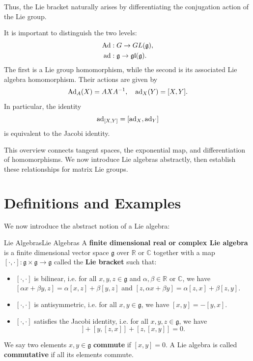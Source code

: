 \documentclass[../main.tex]{subfiles}
\begin{document}
Thus, the Lie bracket naturally arises by differentiating the conjugation action of the Lie group.

\begin{remark}
  It is important to distinguish the two levels:
  \begin{equation}
    \begin{aligned}
      \operatorname{Ad} &:G\to GL(\mathfrak{g}),\\
      \operatorname{ad} &:\mathfrak{g}\to\mathfrak{gl}(\mathfrak{g}).
    \end{aligned}
  \end{equation}
  The first is a Lie group homomorphism, while the second is its associated Lie algebra homomorphism. Their actions are given by
  \begin{equation}
    \operatorname{Ad}_A(X)=AXA^{-1},\quad
    \operatorname{ad}_X(Y)=[X,Y].
  \end{equation}
  In particular, the identity
  \begin{equation}
    \operatorname{ad}_{[X,Y]}=[\operatorname{ad}_X,\operatorname{ad}_Y]
  \end{equation}
  is equivalent to the Jacobi identity.
\end{remark}

This overview connects tangent spaces, the exponential map, and differentiation of homomorphisms. We now introduce Lie algebras abstractly, then establish these relationships for matrix Lie groups.

\section{Definitions and Examples}

We now introduce the abstract notion of a Lie algebra:

\begin{definition}{Lie Algebras}{Lie Algebras}
  A \textbf{finite dimensional real or complex Lie algebra} is a finite dimensional vector space $\mathfrak{g}$ over $\mathbb{R}$ or $\mathbb{C}$ together with a map $[\cdot,\cdot]:\mathfrak{g}\times\mathfrak{g}\to\mathfrak{g}$ called the \textbf{Lie bracket} such that:
  \begin{itemize}
    \item $[\cdot,\cdot]$ is bilinear, i.e. for all $x,y,z\in\mathfrak{g}$ and $\alpha,\beta\in\mathbb{R}$ or $\mathbb{C}$, we have $[\alpha x+\beta y,z]=\alpha[x,z]+\beta[y,z]$ and $[z,\alpha x+\beta y]=\alpha[z,x]+\beta[z,y]$.
    \item $[\cdot,\cdot]$ is antisymmetric, i.e. for all $x,y\in\mathfrak{g}$, we have $[x,y]=-[y,x]$.
    \item $[\cdot,\cdot]$ satisfies the Jacobi identity, i.e. for all $x,y,z\in\mathfrak{g}$, we have
      \begin{equation}
        [x,[y,z]]+[y,[z,x]]+[z,[x,y]]=0.
      \end{equation}
  \end{itemize}
  We say two elements $x,y\in\mathfrak{g}$ \textbf{commute} if $[x,y]=0$. A Lie algebra is called \textbf{commutative} if all its elements commute.
\end{definition}
\end{document}
